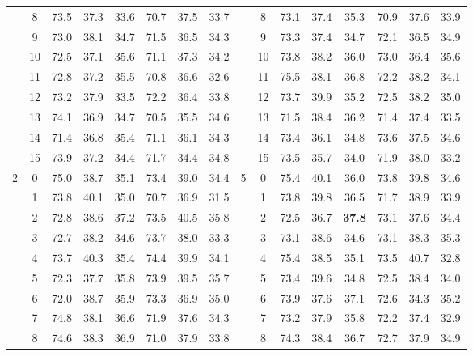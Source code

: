 \begin{table}[p]
{\begin{tabular}{c c | c c c | c c c || c c | c c c | c c c}
             & 8 & 73.5 & 37.3 & 33.6 & 70.7 & 37.5 & 33.7 &  & 8 & 73.1 & 37.4 & 35.3 & 70.9 & 37.6 & 33.9 \\
             & 9 & 73.0 & 38.1 & 34.7 & 71.5 & 36.5 & 34.3 &  & 9 & 73.3 & 37.4 & 34.7 & 72.1 & 36.5 & 34.9 \\
             & 10 & 72.5 & 37.1 & 35.6 & 71.1 & 37.3 & 34.2 &  & 10 & 73.8 & 38.2 & 36.0 & 73.0 & 36.4 & 35.6 \\
             & 11 & 72.8 & 37.2 & 35.5 & 70.8 & 36.6 & 32.6 &  & 11 & 75.5 & 38.1 & 36.8 & 72.2 & 38.2 & 34.1 \\
             & 12 & 73.2 & 37.9 & 33.5 & 72.2 & 36.4 & 33.8 &  & 12 & 73.7 & 39.9 & 35.2 & 72.5 & 38.2 & 35.0 \\
             & 13 & 74.1 & 36.9 & 34.7 & 70.5 & 35.5 & 34.6 &  & 13 & 71.5 & 38.4 & 36.2 & 71.4 & 37.4 & 33.5 \\
             & 14 & 71.4 & 36.8 & 35.4 & 71.1 & 36.1 & 34.3 &  & 14 & 73.4 & 36.1 & 34.8 & 73.6 & 37.5 & 34.6 \\
             & 15 & 73.9 & 37.2 & 34.4 & 71.7 & 34.4 & 34.8 &  & 15 & 73.5 & 35.7 & 34.0 & 71.9 & 38.0 & 33.2 \\
            \midrule
            \multirow{16}{*}{2} & 0 & 75.0 & 38.7 & 35.1 & 73.4 & 39.0 & 34.4 & \multirow{16}{*}{5} & 0 & 75.4 & 40.1 & 36.0 & 73.8 & 39.8 & 34.6 \\
             & 1 & 73.8 & 40.1 & 35.0 & 70.7 & 36.9 & 31.5 &  & 1 & 73.8 & 39.8 & 36.5 & 71.7 & 38.9 & 33.9 \\
             & 2 & 72.8 & 38.6 & 37.2 & 73.5 & 40.5 & 35.8 &  & 2 & 72.5 & 36.7 & \textbf{37.8} & 73.1 & 37.6 & 34.4 \\
             & 3 & 72.7 & 38.2 & 34.6 & 73.7 & 38.0 & 33.3 &  & 3 & 73.1 & 38.6 & 34.6 & 73.1 & 38.3 & 35.3 \\
             & 4 & 73.7 & 40.3 & 35.4 & 74.4 & 39.9 & 34.1 &  & 4 & 75.4 & 38.5 & 35.1 & 73.5 & 40.7 & 32.8 \\
             & 5 & 72.3 & 37.7 & 35.8 & 73.9 & 39.5 & 35.7 &  & 5 & 73.4 & 39.6 & 34.8 & 72.5 & 38.4 & 34.0 \\
             & 6 & 72.0 & 38.7 & 35.9 & 73.3 & 36.9 & 35.0 &  & 6 & 73.9 & 37.6 & 37.1 & 72.6 & 34.3 & 35.2 \\
             & 7 & 74.8 & 38.1 & 36.6 & 71.9 & 37.6 & 34.3 &  & 7 & 73.2 & 37.9 & 35.8 & 72.2 & 37.4 & 32.9 \\
             & 8 & 74.6 & 38.3 & 36.9 & 71.0 & 37.9 & 33.8 &  & 8 & 74.3 & 38.4 & 36.7 & 72.7 & 37.9 & 34.9 \\

\end{tabular}}
\end{table}
